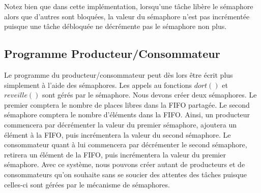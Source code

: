 \documentclass{article}
\begin{document}
Notez bien que dans cette implémentation, lorsqu'une tâche libère le sémaphore alors que d'autres sont bloquées, la valeur du sémaphore n'est pas incrémentée puisque une tâche débloquée ne décrémente pas le sémaphore non plus.

\subsection{Programme Producteur/Consommateur}
Le programme du producteur/consommateur peut dès lors être écrit plus simplement à l'aide des sémaphores. Les appels au fonctions $dort()$ et $reveille()$ sont gérés par le sémaphore.
Nous devons créer deux sémaphores. Le premier comptera le nombre de places libres dans la FIFO partagée. Le second sémaphore comptera le nombre d'éléments dans la FIFO.
Ainsi, un producteur commencera par décrémenter la valeur du premier sémaphore, ajoutera un élément à la FIFO, puis incrémentera la valeur du second sémaphore.
Le consommateur quant à lui commencera par décrémenter le second sémaphore, retirera un élément de la FIFO, puis incrémentera la valeur du premier sémaphore.
Avec ce système, nous pouvons créer autant de producteurs et de consommateurs qu'on souhaite sans se soucier des attentes des tâches puisque celles-ci sont gérées par le mécanisme de sémaphores.
\end{document}
